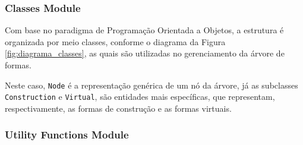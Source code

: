 \subsubsection{Classes Module}
\label{sec:classes}

Com base no paradigma de Programação Orientada a Objetos, a estrutura é organizada por meio classes, conforme o diagrama da Figura \ref{fig:diagrama_classes}, as quais são utilizadas no gerenciamento da árvore de formas.

\begin{figure}[h!]
	\centering
	\captionsetup{width=15cm}
	{}	
\end{figure}

Neste caso, \texttt{Node} é a representação genérica de um nó da árvore, já as subclasses \texttt{Construction} e \texttt{Virtual}, são entidades mais específicas, que representam, respectivamente, as formas de construção e as formas virtuais.

\subsubsection{Utility Functions Module}
\label{sec:utilitary_functions}

